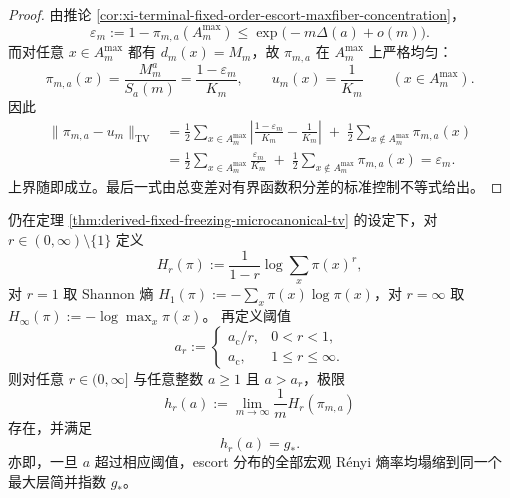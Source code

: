 \begin{proof}
由推论 \ref{cor:xi-terminal-fixed-order-escort-maxfiber-concentration}，
\[
\varepsilon_m
:=
1-\pi_{m,a}(A_m^{\max})
\le
\exp\!\bigl(-m\Delta(a)+o(m)\bigr).
\]
而对任意 \(x\in A_m^{\max}\) 都有 \(d_m(x)=M_m\)，故 \(\pi_{m,a}\) 在 \(A_m^{\max}\) 上严格均匀：
\[
\pi_{m,a}(x)=\frac{M_m^a}{S_a(m)}=\frac{1-\varepsilon_m}{K_m},
\qquad
u_m(x)=\frac{1}{K_m}
\qquad
(x\in A_m^{\max}).
\]
因此
\[
\begin{aligned}
\|\pi_{m,a}-u_m\|_{\mathrm{TV}}
&=
\frac12\sum_{x\in A_m^{\max}}
\left|
\frac{1-\varepsilon_m}{K_m}-\frac{1}{K_m}
\right|
\;+\;
\frac12\sum_{x\notin A_m^{\max}}\pi_{m,a}(x) \\
&=
\frac12\sum_{x\in A_m^{\max}}\frac{\varepsilon_m}{K_m}
\;+\;
\frac12\sum_{x\notin A_m^{\max}}\pi_{m,a}(x)
=
\varepsilon_m.
\end{aligned}
\]
上界随即成立。最后一式由总变差对有界函数积分差的标准控制不等式给出。
\end{proof}

\begin{theorem}\label{thm:derived-fixed-freezing-renyi-surface}
仍在定理 \ref{thm:derived-fixed-freezing-microcanonical-tv} 的设定下，对 \(r\in(0,\infty)\setminus\{1\}\) 定义
\[
H_r(\pi):=\frac{1}{1-r}\log\sum_x \pi(x)^r,
\]
对 \(r=1\) 取 Shannon 熵 \(H_1(\pi):=-\sum_x\pi(x)\log\pi(x)\)，对 \(r=\infty\) 取
\(
H_{\infty}(\pi):=-\log\max_x\pi(x)
\)。
再定义阈值
\[
a_r:=
\begin{cases}
a_{\mathrm c}/r, & 0<r<1,\\[1mm]
a_{\mathrm c}, & 1\le r\le \infty.
\end{cases}
\]
则对任意 \(r\in(0,\infty]\) 与任意整数 \(a\ge 1\) 且 \(a>a_r\)，极限
\[
h_r(a):=\lim_{m\to\infty}\frac{1}{m}H_r(\pi_{m,a})
\]
存在，并满足
\[
h_r(a)=g_{\ast}.
\]
亦即，一旦 \(a\) 超过相应阈值，escort 分布的全部宏观 Rényi 熵率均塌缩到同一个最大层简并指数 \(g_{\ast}\)。
\end{theorem}


